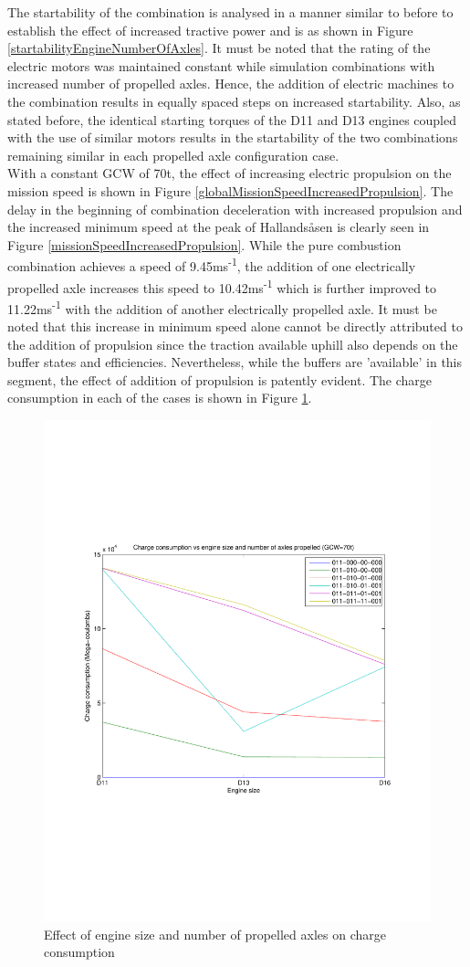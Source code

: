 \documentclass{article}
\begin{document}
The startability of the combination is analysed in a manner similar to before to establish the effect of increased tractive power and is as shown in Figure \ref{startabilityEngineNumberOfAxles}. It must be noted that the rating of the electric motors was maintained constant while simulation combinations with increased number of propelled axles. Hence, the addition of electric machines to the combination results in equally spaced steps on increased startability. Also, as stated before, the identical starting torques of the D11 and D13 engines coupled with the use of similar motors results in the startability of the two combinations remaining similar in each propelled axle configuration case.\\

With a constant GCW of 70t, the effect of increasing electric propulsion on the mission speed is shown in Figure \ref{globalMissionSpeedIncreasedPropulsion}. The delay in the beginning of combination deceleration with increased propulsion and the increased minimum speed at the peak of Hallands\aa sen is clearly seen in Figure \ref{missionSpeedIncreasedPropulsion}. While the pure combustion combination achieves a speed of 9.45ms\textsuperscript{-1}, the addition of one electrically propelled axle increases this speed to 10.42ms\textsuperscript{-1} which is further improved to 11.22ms\textsuperscript{-1} with the addition of another electrically propelled axle. It must be noted that this increase in minimum speed alone cannot be directly attributed to the addition of propulsion since the traction available uphill also depends on the buffer states and efficiencies. Nevertheless, while the buffers are 'available' in this segment, the effect of addition of propulsion is patently evident. The charge consumption in each of the cases is shown in Figure \ref{chargeEngineSizeNumberOfAxles}.\\

\begin{figure}[h!]
\centering
\includegraphics[width=0.5\linewidth, clip=true, trim=45 185 65 208]{Figures/Increasing_number_of_axles/Charge_consumption_vs_axle_number_and_engine_size.pdf}
\caption{Effect of engine size and number of propelled axles on charge consumption}
\label{chargeEngineSizeNumberOfAxles}
\end{figure}
\end{document}
